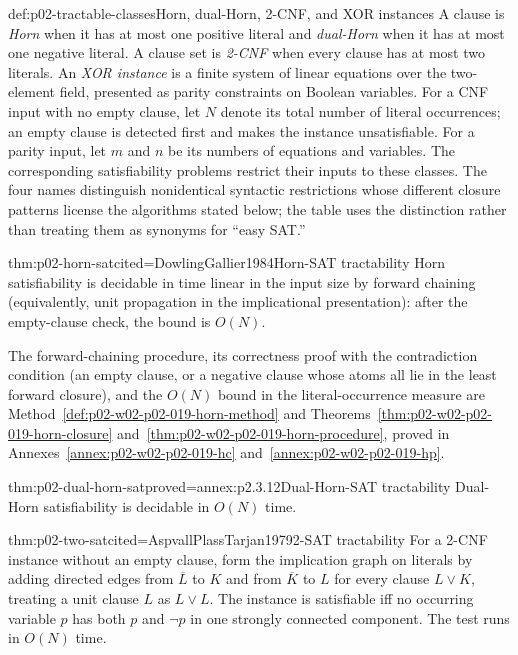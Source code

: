 \begin{hbdefinition}{def:p02-tractable-classes}{Horn, dual-Horn, 2-CNF, and XOR instances}
A clause is \emph{Horn} when it has at most one positive literal and
\emph{dual-Horn} when it has at most one negative literal.  A clause set is
\emph{2-CNF} when every clause has at most two literals.  An
\emph{XOR instance} is a finite system of linear equations over the
two-element field, presented as parity constraints on Boolean variables.
For a CNF input with no empty clause, let \(N\) denote its total number of
literal occurrences; an empty clause is detected first and makes the instance
unsatisfiable.  For a parity input, let \(m\) and \(n\) be its numbers of
equations and variables.
The corresponding satisfiability problems restrict their inputs to these
classes.  The four names distinguish nonidentical syntactic restrictions whose
different closure patterns license the algorithms stated below; the table uses
the distinction rather than treating them as synonyms for ``easy SAT.''
\end{hbdefinition}

\begin{hbtheorem}{thm:p02-horn-sat}{cited=DowlingGallier1984}{Horn-SAT tractability}
Horn satisfiability is decidable in time linear in the input size by forward
chaining (equivalently, unit propagation in the implicational presentation):
after the empty-clause check, the bound is \(O(N)\).
\end{hbtheorem}

The forward-chaining procedure, its correctness proof with the contradiction
condition (an empty clause, or a negative clause whose atoms all lie in the
least forward closure), and the \(O(N)\) bound in the literal-occurrence
measure are Method~\ref{def:p02-w02-p02-019-horn-method} and
Theorems~\ref{thm:p02-w02-p02-019-horn-closure}
and~\ref{thm:p02-w02-p02-019-horn-procedure}, proved in
Annexes~\ref{annex:p02-w02-p02-019-hc} and~\ref{annex:p02-w02-p02-019-hp}.

\begin{hbcorollary}{thm:p02-dual-horn-sat}{proved=annex:p2.3.12}{Dual-Horn-SAT tractability}
Dual-Horn satisfiability is decidable in \(O(N)\) time.
\end{hbcorollary}

\begin{hbtheorem}{thm:p02-two-sat}{cited=AspvallPlassTarjan1979}{2-SAT tractability}
For a 2-CNF instance without an empty clause, form the implication graph on
literals by adding directed edges from \(\overline L\) to \(K\) and from
\(\overline K\) to \(L\) for every clause \(L\lor K\), treating a unit clause
\(L\) as \(L\lor L\).  The instance
is satisfiable iff no occurring variable \(p\) has both \(p\) and \(\neg p\)
in one strongly connected component.  The test runs in \(O(N)\) time.
\end{hbtheorem}


